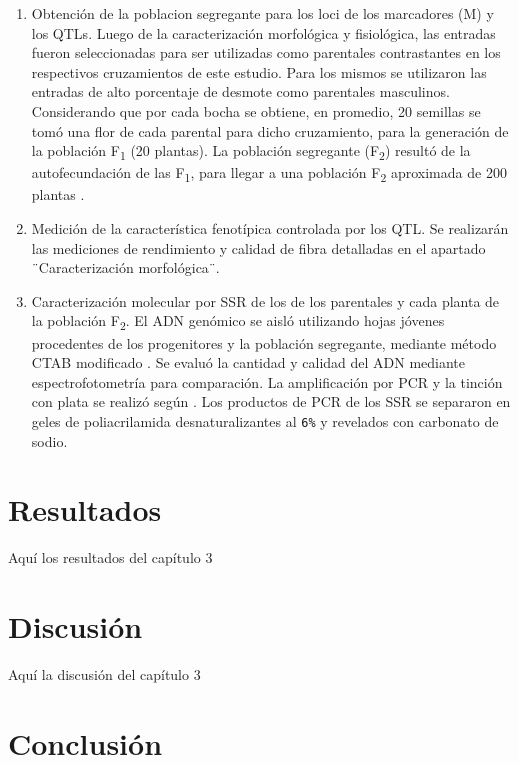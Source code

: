 \documentclass[12pt,oneside]{reedthesis}
\begin{document}
\begin{enumerate}
\def\labelenumi{\roman{enumi}.}
\item
  Obtención de la poblacion segregante para los loci de los marcadores (M) y los QTLs. Luego de la caracterización morfológica y fisiológica, las entradas fueron seleccionadas para ser utilizadas como parentales contrastantes en los respectivos cruzamientos de este estudio. Para los mismos se utilizaron las entradas de alto porcentaje de desmote como parentales masculinos. Considerando que por cada bocha se obtiene, en promedio, 20 semillas \autocite{naeem2017} se tomó una flor de cada parental para dicho cruzamiento, para la generación de la población F\textsubscript{1} (20 plantas). La población segregante (F\textsubscript{2}) resultó de la autofecundación de las F\textsubscript{1}, para llegar a una población F\textsubscript{2} aproximada de 200 plantas \autocite{bardak2018,zhang2003}.
\item
  Medición de la característica fenotípica controlada por los QTL. Se realizarán las mediciones de rendimiento y calidad de fibra detalladas en el apartado ¨Caracterización morfológica¨.
\item
  Caracterización molecular por SSR de los de los parentales y cada planta de la población F\textsubscript{2}. El ADN genómico se aisló utilizando hojas jóvenes procedentes de los progenitores y la población segregante, mediante método CTAB modificado \autocite{zhang2000,paterson1993}. Se evaluó la cantidad y calidad del ADN mediante espectrofotometría para comparación. La amplificación por PCR y la tinción con plata se realizó según \textcite{lin2005} . Los productos de PCR de los SSR se separaron en geles de poliacrilamida desnaturalizantes al \texttt{6\%} y revelados con carbonato de sodio\autocite{lin2005}.
\end{enumerate}

\section{Resultados}\label{resultados-2}

Aquí los resultados del capítulo 3

\section{Discusión}\label{discusiuxf3n-2}

Aquí la discusión del capítulo 3

\section{Conclusión}\label{conclusiuxf3n-2}
\end{document}
